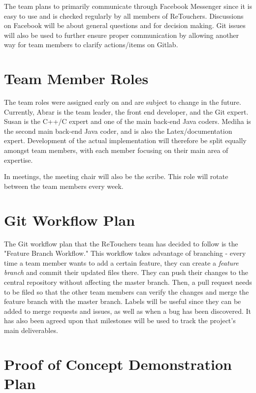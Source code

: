 \documentclass{article}
\begin{document}
	The team plans to primarily communicate through Facebook Messenger since it is easy to use and is checked regularly by all members of ReTouchers. Discussions on Facebook will be about general questions and for decision making. Git issues will also be used to further ensure proper communication by allowing another way for team members to clarify actions/items on Gitlab. 

\section{Team Member Roles}

	The team roles were assigned early on and are subject to change in the future. Currently, Abrar is the team leader, the front end developer, and the Git expert. Susan is the C++/C expert and one of the main back-end Java coders. Mediha is the second main back-end Java coder, and is also the Latex/documentation expert. Development of the actual implementation will therefore be split equally amongst team members, with each member focusing on their main area of expertise.

	In meetings, the meeting chair will also be the scribe. This role will rotate between the team members every week.

\section{Git Workflow Plan}

	The Git workflow plan that the ReTouchers team has decided to follow is the "Feature Branch Workflow." This workflow takes advantage of branching - every time a team member wants to add a 
certain feature, they can create a\textit{ feature branch} and commit their updated files there. They can push their changes to the central repository without affecting the master branch. Then, a pull request needs to be filed so that the other team members can verify the changes and merge the feature branch with the master branch. Labels will be useful since they can be added to merge requests and issues, as well as when a bug has been discovered. It has also been agreed upon that milestones will be used to track the project's main deliverables.

\section{Proof of Concept Demonstration Plan}
\end{document}
